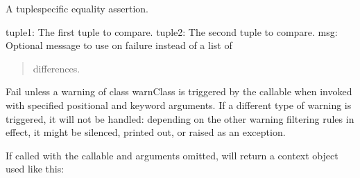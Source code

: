 \documentclass[letterpaper,10pt,english]{sphinxmanual}
\begin{document}
\begin{fulllineitems}
\begin{fulllineitems}
\end{fulllineitems}


\begin{fulllineitems}
\label{\detokenize{_autosummary/tests.test_unit.test_sqlite:tests.test_unit.test_sqlite.assertTupleEqual}}
\pysigstartsignatures
{}
\pysigstopsignatures
\sphinxAtStartPar
A tuple\sphinxhyphen{}specific equality assertion.
\begin{description}
\sphinxAtStartPar
tuple1: The first tuple to compare.
tuple2: The second tuple to compare.
msg: Optional message to use on failure instead of a list of
\begin{quote}

\sphinxAtStartPar
differences.
\end{quote}

\end{description}

\end{fulllineitems}


\begin{fulllineitems}
\label{\detokenize{_autosummary/tests.test_unit.test_sqlite:tests.test_unit.test_sqlite.assertWarns}}
\pysigstartsignatures
{}
\pysigstopsignatures
\sphinxAtStartPar
Fail unless a warning of class warnClass is triggered
by the callable when invoked with specified positional and
keyword arguments.  If a different type of warning is
triggered, it will not be handled: depending on the other
warning filtering rules in effect, it might be silenced, printed
out, or raised as an exception.

\sphinxAtStartPar
If called with the callable and arguments omitted, will return a
context object used like this:

\begin{sphinxVerbatim}[commandchars=\\\{\}]
 
\end{sphinxVerbatim}


\end{fulllineitems}
\end{fulllineitems}
\end{document}

